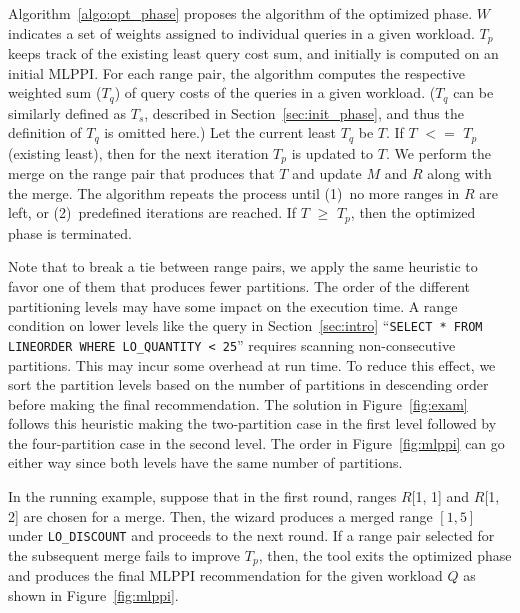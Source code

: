 \documentclass[runningheads]{comsis2}
\def\range#1{$[{#1}]$}
\begin{document}
Algorithm~\ref{algo:opt_phase} proposes the algorithm of the optimized phase. 
$W$ indicates a set of weights assigned to individual queries in a given workload. 
$T_{p}$ keeps track of the existing least query cost sum, and initially is computed on an initial MLPPI. 
For each range pair, the algorithm 
computes the respective weighted sum ($T_{q}$) of query costs of the queries in a given workload. 
($T_{q}$ can be similarly defined as $T_{s}$, described in Section~\ref{sec:init_phase}, 
and thus the definition of $T_{q}$ is omitted here.)
Let the current least $T_{q}$ be $T$. 
If $T$ $<=$ $T_{p}$ (existing least), then for the next iteration $T_{p}$ is updated to $T$. 
We perform the merge on the range pair that produces that $T$ and update $M$ and $R$ along with the merge. 
The algorithm repeats the process until (1)~no more ranges in $R$ are left, or (2)~predefined iterations are reached. 
If $T$ $\geq$ $T_{p}$, then the optimized phase is terminated.

Note that to break a tie between range pairs, 
we apply the same heuristic to favor one of them that produces fewer partitions. 
The order of the different partitioning levels may have some impact on 
the execution time. A range condition on lower levels like the query 
in Section~\ref{sec:intro} 
``{\tt SELECT * FROM LINEORDER WHERE LO\_QUANTITY < 25}'' 
requires scanning non-consecutive partitions. 
This may incur some overhead at run time. 
To reduce this effect, we sort the partition levels based on the number of 
partitions in descending order before making the final recommendation. 
The solution in Figure~\ref{fig:exam} follows this heuristic 
making the two-partition case in the first level 
followed by the four-partition case in the second level. 
The order in Figure~\ref{fig:mlppi} can go \hbox{either} way 
since both levels have the same number of \hbox{partitions}.

In the running example, suppose that in the first round, ranges $R$[1, 1] and $R$[1, 2] are chosen for a merge. 
Then, the wizard produces a merged range \range{1, 5} \hbox{under} {\tt LO\_DISCOUNT} and proceeds to the next round. 
If a range pair selected for the subsequent merge fails to improve $T_{p}$, 
then, the tool exits the optimized phase and \hbox{produces} the final MLPPI recommendation for the given workload $Q$ 
as shown in Figure~\ref{fig:mlppi}. 
\end{document}
